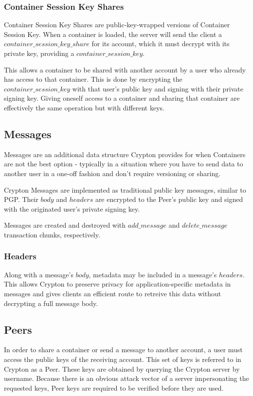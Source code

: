 \documentclass[conference]{IEEEtran}
\begin{document}
\subsubsection{Container Session Key Shares}
Container Session Key Shares are public-key-wrapped versions of Container Session Key.
When a container is loaded, the server will send the client a 
\(container\_session\_key\_share\) for its account, which it must decrypt with
its private key, providing a \(container\_session\_key\).

This allows a container to be shared with another account by a user who
already has access to that container. This is done by encrypting the
\(container\_session\_key\) with that user's public key and signing with their
private signing key. Giving oneself access to a container and sharing that
container are effectively the same operation but with different keys.

\subsection{Messages}
Messages are an additional data structure Crypton provides for when Containers
are not the best option - typically in a situation where you have to send
data to another user in a one-off fashion and don't require versioning or
sharing.

Crypton Messages are implemented as traditional public key messages, similar to PGP.
Their \(body\) and \(headers\) are encrypted to the Peer's public key and signed
with the originated user's private signing key.

Messages are created and destroyed with \(add\_message\) and \(delete\_message\)
transaction chunks, respectively.

\subsubsection{Headers}
Along with a message's \(body\), metadata may be included in a message's
\(headers\). This allows Crypton to preserve privacy for application-specific
metadata in messages and gives clients an efficient route to retreive this data
without decrypting a full message body.

\subsection{Peers}
In order to share a container or send a message to another account,
a user must access the public keys of the receiving account. This set of
keys is referred to in Crypton as a Peer. These keys are obtained by querying the
Crypton server by username. Because there is an obvious attack vector of a server
impersonating the requested keys, Peer keys are required to be verified before
they are used.
\end{document}
